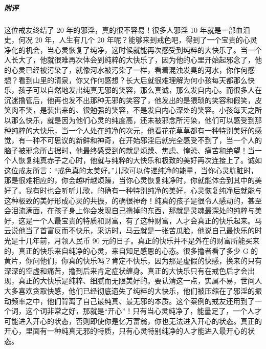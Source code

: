 \begin{case}
    \subparagraph{附评} 这位戒友终结了 20 年的邪淫，真的很不容易！很多人邪淫 10 年就是一部血泪史，何况 20 年，人生有几个 20 年呢？能够来到戒色吧，得到了一个宝贵的心灵净化的机会，当心灵恢复了纯净，这时候就能再次感受到纯粹的大快乐了。当一个人长大了，他就很难再次体会到纯粹的大快乐了，因为他的心里开始起邪念了，他的心灵已经被污染了，就像河水被污染了一样，看着混浊发臭的河水，你作何感想？看到山里的清泉，你又作何感想？长大后就很难理解为何小孩每天都那么快乐，孩子可以自然地发出纯真无邪的笑容，那么真诚，那么发自内心。而很多人在沉迷撸管后，他再也发不出那种无邪的笑容了，他发出的是猥琐的笑容和假笑，皮笑肉不笑，是装出来的、很勉强的笑容，不是发自内心深处的笑容。小孩每天之所以那么快乐，就是因为他们心灵的纯度高，还未被邪念所污染，他们可以感受到那种纯粹的大快乐，当一个人处在纯净的次元，他看花花草草都有一种特别美好的感觉，有一种不可思议的新鲜和神奇，在开始邪淫后就完全感受不到了，当一个人的脑子被邪念所占据时，他最终感受到的就是烦躁、焦虑、惶恐、痛苦和绝望！当一个人恢复纯真赤子之心时，他就与纯粹的大快乐和极致的美好再次连接上了。诚如这位戒友所言：“戒色真的太美好。”儿歌可以传递纯净的能量，当你心灵肮脏时，那是很难相应的，你会越听越烦躁，当你心灵恢复纯净时，你就能体会到其中的美好了。我有时也会听听儿歌，的确有一种特别纯净的美好，心灵恢复纯净后就能与这种极致的美好形成心灵的共振，的确很神奇！纯真的孩子是很令人感动的，甚至会泪流满面，在孩子身上你会发现自己撸掉的东西，那就是灵魂最深处的纯粹与美好，这是一个人最宝贵的特质和财富，有了这种财富，人才会真正的快乐起来。马云说他当了首富反而不快乐，采访时，马云就是一张苦瓜脸，他说自己最快乐的时光是十几年前，月领人民币 90 元的日子。真正的快乐并不是外在的财富所能买来的，真正的快乐来自纯净的心灵，来自知足感恩的心态。很多撸者看了多少 G 的黄片，你问他们，你真的快乐吗？肯定不快乐，因为那是虚假的快感，换来的只有深深的空虚和痛苦，撸到后来肯定症状缠身。真正的大快乐只有在戒色后才会出现，真正的大快乐是纯粹、细腻而无限美好的。要认清这一点，实属不易，世间人大多喜欢贪取快感，他们已经彻底遗失了纯粹的大快乐，他们被压缩在了邪淫的振动频率之中，他们背离了自己最纯真、最无邪的本质。这个案例的戒友还用到了一个词，这个词非常之好，那就是“开心”！只有当心灵纯净了，能量足了，一个人才可能进入开心的状态，否则即使你是亿万富翁，你也无法进入开心的状态。真正的开心，里面有一种纯真无邪的特质，只有心灵特别纯净的人才能进入最开心的状态。
\end{case}

